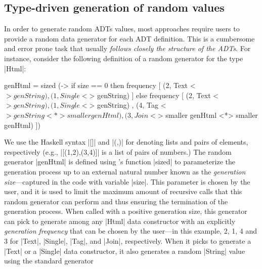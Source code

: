 

\subsection{Type-driven generation of random values}

In order to generate random ADTs values, most approaches require users to provide
a random data generator for each ADT definition.
%
This is a cumbersome and error prone task that usually \emph{follows closely the
  structure of the ADTs}.
%
For instance, consider the following definition of a \quickcheck random
generator for the type |Html|:
%
\begin{code}
genHtml = sized (\size ->
  if size == 0
  then frequency
  [  (2,  Text    <$> genString)
  ,  (1,  Single  <$> genString) ]
  else frequency
  [  (2,  Text    <$> genString)
  ,  (1,  Single  <$> genString)
  ,  (4,  Tag     <$> genString <*> smaller genHtml)
  ,  (3,  Join    <$> smaller genHtml <*> smaller genHtml) ])
\end{code} %
%
We use the Haskell syntax |[]| and |(,)| for denoting lists and pairs of
elements, respectively (e.g., |[(1,2),(3,4)]| is a list of pairs of numbers.)
%
The random generator |genHtml| is defined using \quickcheck's function |sized|
to parameterize the generation process up to an external natural number known as
the \emph{generation size}---captured in the code with variable |size|.
%
This parameter is chosen by the user, and it is used to limit the maximum amount
of recursive calls that this random generator can perform and thus ensuring
the termination of the generation process.
%
When called with a positive generation size, this generator can pick to generate
among any |Html| data constructor with an explicitly \emph{generation frequency}
that can be chosen by the user---in this example, 2, 1, 4 and 3 for |Text|,
|Single|, |Tag|, and |Join|, respectively.
%
When it picks to generate a |Text| or a |Single| data constructor, it also
generates a random |String| value using the standard \quickcheck generator
